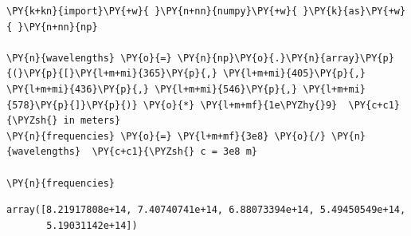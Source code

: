     \begin{tcolorbox}[breakable, size=fbox, boxrule=1pt, pad at break*=1mm,colback=cellbackground, colframe=cellborder]
\begin{Verbatim}[commandchars=\\\{\}]
\PY{k+kn}{import}\PY{+w}{ }\PY{n+nn}{numpy}\PY{+w}{ }\PY{k}{as}\PY{+w}{ }\PY{n+nn}{np}

\PY{n}{wavelengths} \PY{o}{=} \PY{n}{np}\PY{o}{.}\PY{n}{array}\PY{p}{(}\PY{p}{[}\PY{l+m+mi}{365}\PY{p}{,} \PY{l+m+mi}{405}\PY{p}{,} \PY{l+m+mi}{436}\PY{p}{,} \PY{l+m+mi}{546}\PY{p}{,} \PY{l+m+mi}{578}\PY{p}{]}\PY{p}{)} \PY{o}{*} \PY{l+m+mf}{1e\PYZhy{}9}  \PY{c+c1}{\PYZsh{} in meters}
\PY{n}{frequencies} \PY{o}{=} \PY{l+m+mf}{3e8} \PY{o}{/} \PY{n}{wavelengths}  \PY{c+c1}{\PYZsh{} c = 3e8 m}

\PY{n}{frequencies}
\end{Verbatim}
\end{tcolorbox}

            \begin{tcolorbox}[breakable, size=fbox, boxrule=.5pt, pad at break*=1mm, opacityfill=0]
\begin{Verbatim}[commandchars=\\\{\}]
array([8.21917808e+14, 7.40740741e+14, 6.88073394e+14, 5.49450549e+14,
       5.19031142e+14])
\end{Verbatim}
\end{tcolorbox}
        
    \begin{tcolorbox}[breakable, size=fbox, boxrule=1pt, pad at break*=1mm,colback=cellbackground, colframe=cellborder]
\begin{Verbatim}[commandchars=\\\{\}]

\end{Verbatim}
\end{tcolorbox}
